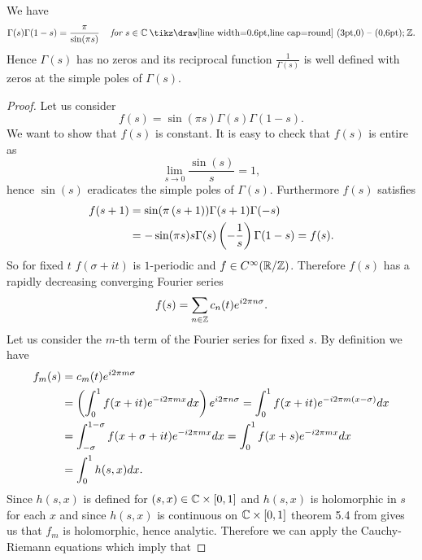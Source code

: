 \begin{theorem}
	We have
\begin{equation*}
	\Gamma(s)\Gamma(1 - s) = \frac{\pi}{\sin(\pi s)} \hsp \textit{  for } s \in \field{C} \mysetminus \field{Z}.
\end{equation*}
	Hence $\Gamma(s)$ has no zeros and its reciprocal function $\frac{1}{\Gamma(s)}$ is well defined with zeros at the simple poles of $\Gamma(s)$.
\end{theorem}
\begin{proof}
	Let us consider
\begin{equation*}
	f(s) = \sin(\pi s) \Gamma(s) \Gamma(1 - s).
\end{equation*}
	We want to show that $f(s)$ is constant. It is easy to check that $f(s)$ is entire as
\begin{equation*}
	\lim\limits_{s \to 0} \frac{\sin(s)}{s} = 1,
\end{equation*}
	hence $\sin(s)$ eradicates the simple poles of $\Gamma(s)$. Furthermore $f(s)$ satisfies
\begin{equation*}
\begin{aligned}
	f(s + 1) 
	&= \sin(\pi \left(s + 1\right)) \Gamma(s + 1) \Gamma(-s) \\ 
	&= -\sin(\pi s) s \Gamma(s) \left(-\frac{1}{s}\right) \Gamma(1 - s) = f(s).
\end{aligned}
\end{equation*}
	So for fixed $t$ $f(\sigma + it)$ is $1$-periodic and $f \in C^\infty(\mathbb{R} / \mathbb{Z})$. Therefore $f(s)$ has a rapidly decreasing converging Fourier series
\begin{equation*}
	f(s) = \sum _{n \in \mathbb{Z}} c_n(t) e^{i 2 \pi n \sigma}.
\end{equation*}
	Let us consider the $m$-th term of the Fourier series for fixed $s$. By definition we have
\begin{equation*}
\begin{aligned}	
	f_m(s)
	&= c_m(t) e^{i 2 \pi m \sigma} \\
	&= \left(\int _0 ^1 f(x + it) e^{- i 2 \pi m x} dx\right) e^{i 2 \pi n \sigma}= \int _0 ^1 f(x + it) e^{- i 2 \pi m (x - \sigma)} dx \\
	&= \int _{-\sigma} ^{1 - \sigma} f(x + \sigma + it) e^{- i 2 \pi m x} dx = \int _0 ^1 f(x + s) e^{- i 2 \pi m x} dx \\
	&= \int _0 ^1 h(s, x) dx.
\end{aligned}
\end{equation*}
	Since $h(s, x)$ is defined for $(s, x) \in \mathbb{C} \times \left[0, 1\right]$ and $h(s, x)$ is holomorphic in $s$ for each $x$ and since $h(s, x)$ is continuous on $\mathbb{C} \times \left[0, 1\right]$ theorem 5.4 from \cite{Stein2003} gives us that $f_m$ is holomorphic, hence analytic. Therefore we can apply the Cauchy-Riemann equations which imply that

\end{proof}
